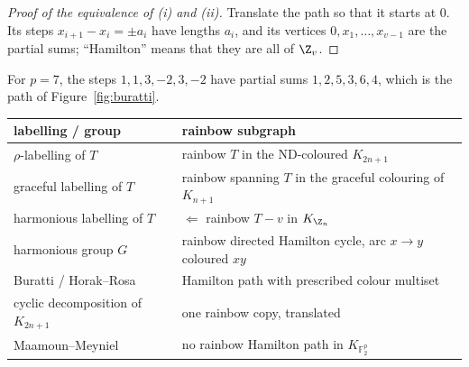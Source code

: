 \begin{proof}[Proof of the equivalence of (i) and (ii)]
Translate the path so that it starts at $0$. Its steps $x_{i+1}-x_i=\pm a_i$ have lengths $a_i$, and its vertices $0,x_1,\dots,x_{v-1}$ are the partial sums; ``Hamilton'' means that they are all of $\Z_v$.
\end{proof}

For $p=7$, the steps $1,1,3,-2,3,-2$ have partial sums $1,2,5,3,6,4$, which is the path of Figure~\ref{fig:buratti}.


\begin{center}
\renewcommand{\arraystretch}{1.25}
\small
\begin{tabular}{p{}p{}}
\textbf{labelling / group} & \textbf{rainbow subgraph}\\\hline
$\rho$-labelling of $T$ & rainbow $T$ in the ND-coloured $K_{2n+1}$\\
graceful labelling of $T$ & rainbow spanning $T$ in the graceful colouring of $K_{n+1}$\\
harmonious labelling of $T$ & $\Leftarrow$ rainbow $T-v$ in $K_{\Z_n}$\\
harmonious group $G$ & rainbow directed Hamilton cycle, arc $x\to y$ coloured $xy$\\
Buratti / Horak--Rosa & Hamilton path with prescribed colour multiset\\
cyclic decomposition of $K_{2n+1}$ & one rainbow copy, translated\\
Maamoun--Meyniel & no rainbow Hamilton path in $K_{\mathbb F_2^p}$
\end{tabular}
\end{center}
